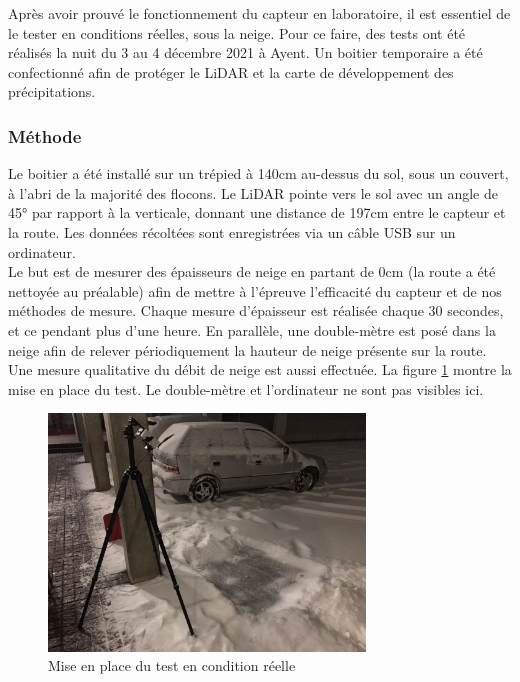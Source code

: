 Après avoir prouvé le fonctionnement du capteur en laboratoire, il est essentiel de le tester en conditions
réelles, sous la neige. Pour ce faire, des tests ont été réalisés la nuit du 3 au 4 décembre 2021 à Ayent.
Un boitier temporaire a été confectionné afin de protéger le LiDAR et la carte de développement des 
précipitations.

\subsubsection{Méthode}

Le boitier a été installé sur un trépied à 140cm au-dessus du sol, sous un couvert, à l'abri de la majorité
des flocons. Le LiDAR pointe vers le sol avec un angle de 45° par rapport à la verticale, donnant une
distance de 197cm entre le capteur et la route. Les données récoltées sont enregistrées via un câble 
USB sur un ordinateur.\\
Le but est de mesurer des épaisseurs de neige en partant de 0cm (la route a été nettoyée au préalable)
afin de mettre à l'épreuve l'efficacité du capteur et de nos méthodes de mesure. Chaque mesure d'épaisseur 
est réalisée chaque 30 secondes, et ce pendant plus d'une heure. En parallèle, une double-mètre est posé 
dans la neige afin de relever périodiquement la hauteur de neige présente sur la route. Une mesure
qualitative du débit de neige est aussi effectuée. La figure \ref{fig:RealTest_Setup} montre la mise en
place du test. Le double-mètre et l'ordinateur ne sont pas visibles ici.

\begin{figure}[H]
    \centering
    \includegraphics[width=0.75\textwidth]{Images/LiDAR/ReadTests_Setup.jpeg}
    \caption{Mise en place du test en condition réelle}
    \label{fig:RealTest_Setup}
\end{figure}

